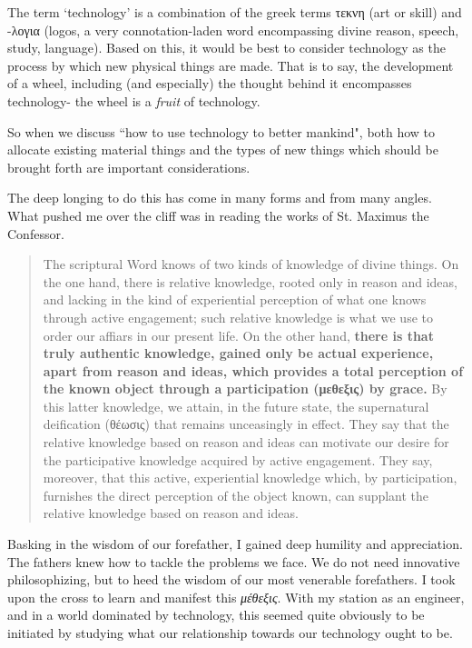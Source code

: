 \documentclass[letterpaper]{article}
\begin{document}
The term `technology' is a combination of the greek terms τεκνη (art or skill) and -λογια (logos, a very connotation-laden word encompassing divine reason, speech, study, language). Based on this, it would be best to consider technology as the process by which new physical things are made. That is to say, the development of a wheel, including (and especially) the thought behind it encompasses technology- the wheel is a \textit{fruit} of technology.

So when we discuss ``how to use technology to better mankind", both how to allocate existing material things and the types of new things which should be brought forth are important considerations. 

The deep longing to do this has come in many forms and from many angles. What pushed me over the cliff was in reading the works of St. Maximus the Confessor.

\begin{quote}
  The scriptural Word knows of two kinds of knowledge of divine things. On the one hand, there is relative knowledge, rooted only in reason and ideas, and lacking in the kind of experiential perception of what one knows through active engagement; such relative knowledge is what we use to order our affiars in our present life. On the other hand, \textbf{there is that truly authentic knowledge, gained only be actual experience, apart from reason and ideas, which provides a total perception of the known object through a participation (μεθεξις) by grace.} By this latter knowledge, we attain, in the future state, the supernatural deification (θέωσις) that remains unceasingly in effect. They say that the relative knowledge based on reason and ideas can motivate our desire for the participative knowledge acquired by active engagement. They say, moreover, that this active, experiential knowledge which, by participation, furnishes the direct perception of the object known, can supplant the relative knowledge based on reason and ideas.
\end{quote}

Basking in the wisdom of our forefather, I gained deep humility and appreciation. The fathers knew how to tackle the problems we face. We do not need innovative philosophizing, but to heed the wisdom of our most venerable forefathers. I took upon the cross to learn and manifest this \textit{μέθεξις}. With my station as an engineer, and in a world dominated by technology, this seemed quite obviously to be initiated by studying what our relationship towards our technology ought to be.
\end{document}
